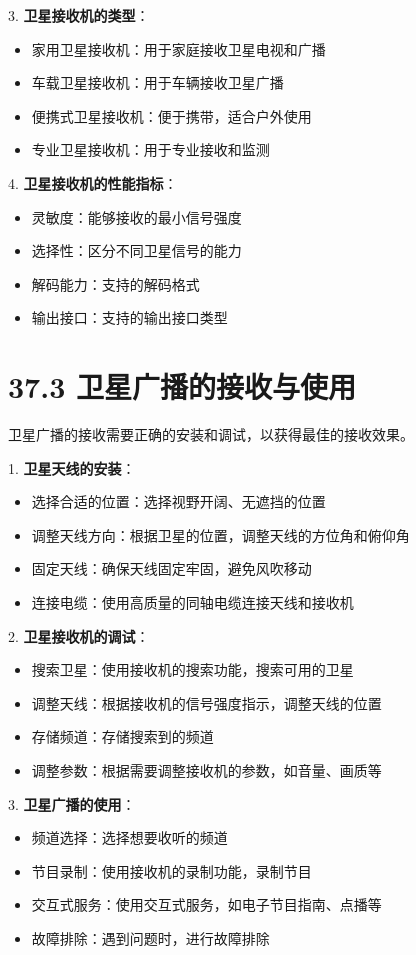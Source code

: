 \documentclass[12pt,UTF8]{ctexbook}
\begin{document}
3. \textbf{卫星接收机的类型}：
   \begin{itemize}[leftmargin=3.5em]
   \item 家用卫星接收机：用于家庭接收卫星电视和广播
   \item 车载卫星接收机：用于车辆接收卫星广播
   \item 便携式卫星接收机：便于携带，适合户外使用
   \item 专业卫星接收机：用于专业接收和监测
   \end{itemize}

4. \textbf{卫星接收机的性能指标}：
   \begin{itemize}[leftmargin=3.5em]
   \item 灵敏度：能够接收的最小信号强度
   \item 选择性：区分不同卫星信号的能力
   \item 解码能力：支持的解码格式
   \item 输出接口：支持的输出接口类型
   \end{itemize}

\section*{37.3 卫星广播的接收与使用}

卫星广播的接收需要正确的安装和调试，以获得最佳的接收效果。

1. \textbf{卫星天线的安装}：
   \begin{itemize}[leftmargin=3.5em]
   \item 选择合适的位置：选择视野开阔、无遮挡的位置
   \item 调整天线方向：根据卫星的位置，调整天线的方位角和俯仰角
   \item 固定天线：确保天线固定牢固，避免风吹移动
   \item 连接电缆：使用高质量的同轴电缆连接天线和接收机
   \end{itemize}

2. \textbf{卫星接收机的调试}：
   \begin{itemize}[leftmargin=3.5em]
   \item 搜索卫星：使用接收机的搜索功能，搜索可用的卫星
   \item 调整天线：根据接收机的信号强度指示，调整天线的位置
   \item 存储频道：存储搜索到的频道
   \item 调整参数：根据需要调整接收机的参数，如音量、画质等
   \end{itemize}

3. \textbf{卫星广播的使用}：
   \begin{itemize}[leftmargin=3.5em]
   \item 频道选择：选择想要收听的频道
   \item 节目录制：使用接收机的录制功能，录制节目
   \item 交互式服务：使用交互式服务，如电子节目指南、点播等
   \item 故障排除：遇到问题时，进行故障排除
   \end{itemize}
\end{document}

